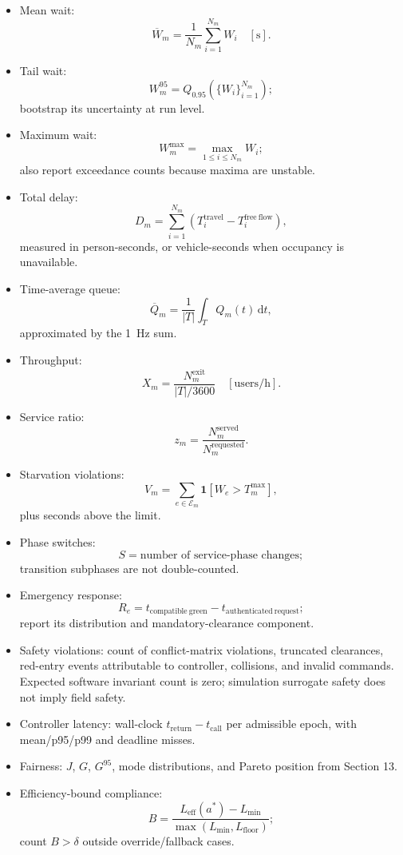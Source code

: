 \documentclass[
  english,
  11pt,
  a4paper,
]{article}
\providecommand{\tightlist}{%
  \setlength{\itemsep}{0pt}\setlength{\parskip}{0pt}}
\begin{document}
\begin{itemize}
\tightlist
\item
  Mean wait:
  \[
    \overline{W}_m = \frac{1}{N_m}\sum_{i=1}^{N_m} W_i
    \quad [\mathrm{s}].
  \]
\item
  Tail wait:
  \[
    W_m^{95} = Q_{0.95}\!\left(\{W_i\}_{i=1}^{N_m}\right);
  \]
  bootstrap its uncertainty at run level.
\item
  Maximum wait:
  \[
    W_m^{\max} = \max_{1\le i\le N_m} W_i;
  \]
  also report exceedance counts because maxima are unstable.
\item
  Total delay:
  \[
    D_m = \sum_{i=1}^{N_m}
    \left(T_i^{\mathrm{travel}}-T_i^{\mathrm{free\ flow}}\right),
  \]
  measured in person-seconds, or vehicle-seconds when occupancy is
  unavailable.
\item
  Time-average queue:
  \[
    \overline{Q}_m = \frac{1}{|T|}\int_T Q_m(t)\,\mathrm{d}t,
  \]
  approximated by the 1~Hz sum.
\item
  Throughput:
  \[
    X_m = \frac{N_m^{\mathrm{exit}}}{|T|/3600}
    \quad [\mathrm{users/h}].
  \]
\item
  Service ratio:
  \[
    z_m = \frac{N_m^{\mathrm{served}}}{N_m^{\mathrm{requested}}}.
  \]
\item
  Starvation violations:
  \[
    V_m = \sum_{e\in\mathcal{E}_m}
      \mathbf{1}\!\left[W_e>T_m^{\max}\right],
  \]
  plus seconds above the limit.
\item
  Phase switches:
  \[
    S = \text{number of service-phase changes};
  \]
  transition subphases are not double-counted.
\item
  Emergency response:
  \[
    R_e = t_{\mathrm{compatible\ green}}
          -t_{\mathrm{authenticated\ request}};
  \]
  report its distribution and mandatory-clearance component.
\item
  Safety violations: count of conflict-matrix violations, truncated
  clearances, red-entry events attributable to controller, collisions,
  and invalid commands. Expected software invariant count is zero;
  simulation surrogate safety does not imply field safety.
\item
  Controller latency: wall-clock \(t_{\mathrm{return}}-t_{\mathrm{call}}\)
  per admissible
  epoch, with mean/p95/p99 and deadline misses.
\item
  Fairness: \(J\), \(G\), \(G^{95}\), mode
  distributions, and Pareto position from Section 13.
\item
  Efficiency-bound compliance:
  \[
    B = \frac{L_{\mathrm{eff}}(a^*)-L_{\min}}
             {\max\!\left(L_{\min},L_{\mathrm{floor}}\right)};
  \]
  count \(B>\delta\) outside override/fallback cases.
\end{itemize}
\end{document}
